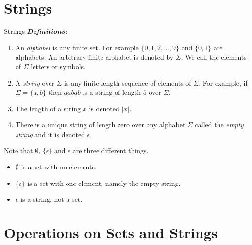 \documentclass[style=sailor,size=12pt]{powerdot}
\begin{document}
\section[slide=false]{Strings}
\begin{slide}[bm=,toc=]{Strings}
\emph{\textbf{Definitions:}}
\begin{enumerate}
\item An \emph{alphabet} is any finite set. For example $\{0,1,2,...,9\}$ and
      $\{0,1\}$ are alphabets. An arbitrary finite alphabet is denoted by 
      $\Sigma$. We call the elements of $\Sigma$ letters or symbols.
\item A \emph{string} over $\Sigma$ is any finite-length sequence of elements of
      $\Sigma$. For example, if $\Sigma = \{a,b\}$ then $aabab$ is a string of
      length $5$ over $\Sigma$.
\item The length of a string $x$ is denoted $|x|$. 
\item There is a unique string of length zero over any alphabet $\Sigma$ called
      the \emph{empty string} and it is denoted $\epsilon$.
\end{enumerate} 
    Note that $\emptyset$, $\{\epsilon\}$ and $\epsilon$ are three different things.
    \begin{itemize}
    \item $\emptyset$ is a set with no elements.
    \item $\{\epsilon\}$ is a set with one element, namely the empty string.
    \item $\epsilon$ is a string, not a set.
    \end{itemize}
\end{slide}

\section[slide=true]{Operations on Sets and Strings}
\end{document}
